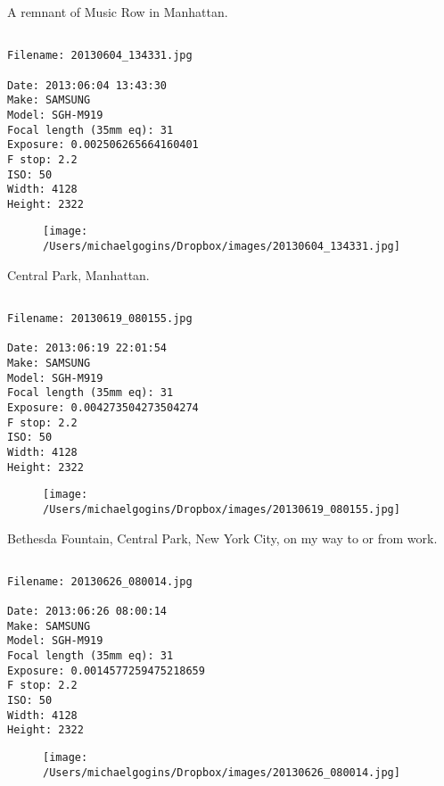 \documentclass[11pt,letter,DIV=14,paper=landscape]{scrbook}
\begin{document}
\clearpage
\noindent A remnant of Music Row in Manhattan.
\noindent
\begin{lstlisting}

Filename: 20130604_134331.jpg

Date: 2013:06:04 13:43:30
Make: SAMSUNG
Model: SGH-M919
Focal length (35mm eq): 31
Exposure: 0.002506265664160401
F stop: 2.2
ISO: 50
Width: 4128
Height: 2322
\end{lstlisting}
\clearpage

\begin{figure}
\texttt{[image: /Users/michaelgogins/Dropbox/images/20130604\_134331.jpg]}
\end{figure}
    
\clearpage
\noindent Central Park, Manhattan.
\noindent
\begin{lstlisting}

Filename: 20130619_080155.jpg

Date: 2013:06:19 22:01:54
Make: SAMSUNG
Model: SGH-M919
Focal length (35mm eq): 31
Exposure: 0.004273504273504274
F stop: 2.2
ISO: 50
Width: 4128
Height: 2322
\end{lstlisting}
\clearpage

\begin{figure}
\texttt{[image: /Users/michaelgogins/Dropbox/images/20130619\_080155.jpg]}
\end{figure}
    
\clearpage
\noindent Bethesda Fountain, Central Park, New York City, on my way to or from work.
\noindent
\begin{lstlisting}

Filename: 20130626_080014.jpg

Date: 2013:06:26 08:00:14
Make: SAMSUNG
Model: SGH-M919
Focal length (35mm eq): 31
Exposure: 0.0014577259475218659
F stop: 2.2
ISO: 50
Width: 4128
Height: 2322
\end{lstlisting}
\clearpage

\begin{figure}
\texttt{[image: /Users/michaelgogins/Dropbox/images/20130626\_080014.jpg]}
\end{figure}
    
\end{document}
